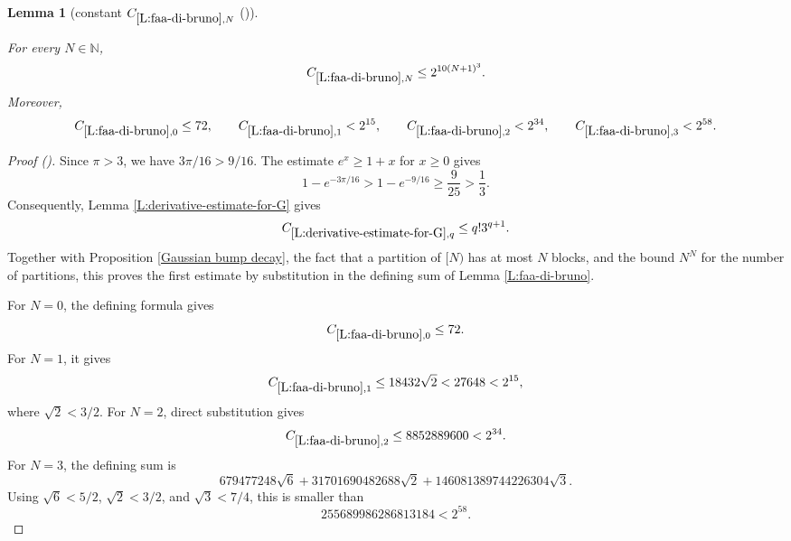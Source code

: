 \documentclass[12pt,reqno]{amsart}
\newcommand{\auto}{{({\tiny\faCar})}}
\theoremstyle{plain}
\newtheorem{lemma}[theorem]{Lemma}
\numberwithin{equation}{section}
\theoremstyle{remark}
\newcommand{\uses}[1]{}
\newcommand{\usesdefs}[1]{}
\newcommand{\leanok}{}
\newcommand{\lean}[1]{}
\newcommand{\N}{{\mathbb N}}
\begin{document}
\begin{lemma}[constant $C_{\ref{L:faa-di-bruno},N}$ \auto]\label{constant faa di bruno}\uses{L:faa-di-bruno,L:derivative-estimate-for-G,Gaussian bump decay}\usesdefs{}
\lean{Auto.constantFaaDiBruno}
\leanok
For every $N\in\N$,
\begin{equation}\label{constant faa di bruno bound}
C_{\ref{L:faa-di-bruno},N}\le2^{10(N+1)^3}.
\end{equation}
Moreover,
\begin{equation}\label{auto:constant-faa-di-bruno-small}
C_{\ref{L:faa-di-bruno},0}\le72,\qquad
C_{\ref{L:faa-di-bruno},1}<2^{15},\qquad
C_{\ref{L:faa-di-bruno},2}<2^{34},\qquad
C_{\ref{L:faa-di-bruno},3}<2^{58}.
\end{equation}
\end{lemma}
\begin{proof}[Proof \auto]
Since $\pi>3$, we have $3\pi/16>9/16$. The estimate $e^x\ge1+x$ for $x\ge0$ gives
\[
1-e^{-3\pi/16}>1-e^{-9/16}\ge\frac{9}{25}>\frac13.
\]
Consequently, Lemma \ref{L:derivative-estimate-for-G} gives
\[
C_{\ref{L:derivative-estimate-for-G},q}
\le q!3^{q+1}.
\]
Together with Proposition \ref{Gaussian bump decay}, the fact that a partition of $[N)$ has at most $N$ blocks, and the bound $N^N$ for the number of partitions, this proves the first estimate by substitution in the defining sum of Lemma \ref{L:faa-di-bruno}.

For $N=0$, the defining formula gives
\[
C_{\ref{L:faa-di-bruno},0}\le72.
\]
For $N=1$, it gives
\[
C_{\ref{L:faa-di-bruno},1}
\le18432\sqrt2
<27648
<2^{15},
\]
where $\sqrt2<3/2$. For $N=2$, direct substitution gives
\[
C_{\ref{L:faa-di-bruno},2}
\le8852889600
<2^{34}.
\]
For $N=3$, the defining sum is
\[
679477248\sqrt6
+31701690482688\sqrt2
+146081389744226304\sqrt3.
\]
Using $\sqrt6<5/2$, $\sqrt2<3/2$, and $\sqrt3<7/4$, this is smaller than
\[
255689986286813184<2^{58}.
\]
\end{proof}
\end{document}
